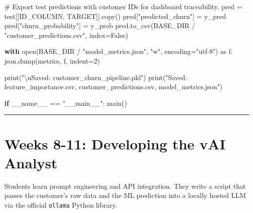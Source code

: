 \documentclass[
  indonesian,
  letterpaper,
  DIV=11,
  numbers=noendperiod]{scrreprt}
\newenvironment{Shaded}{\begin{snugshade}}{\end{snugshade}}
\newcommand{\BuiltInTok}[1]{\textcolor[rgb]{0.00,0.23,0.31}{#1}}
\newcommand{\CharTok}[1]{\textcolor[rgb]{0.13,0.47,0.30}{#1}}
\newcommand{\CommentTok}[1]{\textcolor[rgb]{0.37,0.37,0.37}{#1}}
\newcommand{\ControlFlowTok}[1]{\textcolor[rgb]{0.00,0.23,0.31}{\textbf{#1}}}
\newcommand{\DecValTok}[1]{\textcolor[rgb]{0.68,0.00,0.00}{#1}}
\newcommand{\ImportTok}[1]{\textcolor[rgb]{0.00,0.46,0.62}{#1}}
\newcommand{\NormalTok}[1]{\textcolor[rgb]{0.00,0.23,0.31}{#1}}
\newcommand{\OperatorTok}[1]{\textcolor[rgb]{0.37,0.37,0.37}{#1}}
\newcommand{\StringTok}[1]{\textcolor[rgb]{0.13,0.47,0.30}{#1}}
\newcommand{\VariableTok}[1]{\textcolor[rgb]{0.07,0.07,0.07}{#1}}
\begin{document}
\begin{Shaded}
\begin{Highlighting}[]
    \CommentTok{\# Export test predictions with customer IDs for dashboard traceability.}
\NormalTok{    pred }\OperatorTok{=}\NormalTok{ test[[ID\_COLUMN, TARGET]].copy()}
\NormalTok{    pred[}\StringTok{"predicted\_churn"}\NormalTok{] }\OperatorTok{=}\NormalTok{ y\_pred}
\NormalTok{    pred[}\StringTok{"churn\_probability"}\NormalTok{] }\OperatorTok{=}\NormalTok{ y\_prob}
\NormalTok{    pred.to\_csv(BASE\_DIR }\OperatorTok{/} \StringTok{"customer\_predictions.csv"}\NormalTok{, index}\OperatorTok{=}\VariableTok{False}\NormalTok{)}

    \ControlFlowTok{with} \BuiltInTok{open}\NormalTok{(BASE\_DIR }\OperatorTok{/} \StringTok{"model\_metrics.json"}\NormalTok{, }\StringTok{"w"}\NormalTok{, encoding}\OperatorTok{=}\StringTok{"utf{-}8"}\NormalTok{) }\ImportTok{as}\NormalTok{ f:}
\NormalTok{        json.dump(metrics, f, indent}\OperatorTok{=}\DecValTok{2}\NormalTok{)}

    \BuiltInTok{print}\NormalTok{(}\StringTok{"}\CharTok{\textbackslash{}n}\StringTok{Saved: customer\_churn\_pipeline.pkl"}\NormalTok{)}
    \BuiltInTok{print}\NormalTok{(}\StringTok{"Saved: feature\_importance.csv, customer\_predictions.csv, model\_metrics.json"}\NormalTok{)}


\ControlFlowTok{if} \VariableTok{\_\_name\_\_} \OperatorTok{==} \StringTok{"\_\_main\_\_"}\NormalTok{:}
\NormalTok{    main()}
\end{Highlighting}
\end{Shaded}

\begin{center}\rule{0.5\linewidth}{0.5pt}\end{center}

\section{Weeks 8-11: Developing the vAI
Analyst}\label{weeks-8-11-developing-the-vai-analyst}

Students learn prompt engineering and API integration. They write a
script that passes the customer's raw data and the ML prediction into a
locally hosted LLM via the official \texttt{ollama} Python library.
\end{document}
